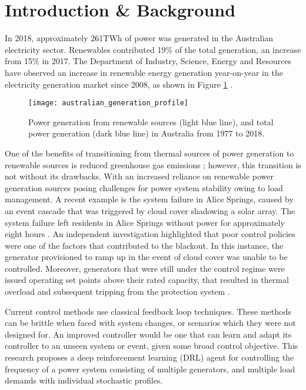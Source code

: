 \section{Introduction \& Background}
In 2018, approximately 261$\si{\tera\watt\hour}$ of power was generated in the Australian electricity sector. Renewables contributed 19\% of the total generation, an increase from 15\% in 2017. The Department of Industry, Science, Energy and Resources have observed an increase in renewable energy generation year-on-year in the electricity generation market since 2008, as shown in Figure \ref{fig:energyts} \cite{Diser2020}.
\begin{figure}[ht]
	\centering
	\texttt{[image: australian\_generation\_profile]}
	\caption{Power generation from renewable sources (light blue line), and total power generation (dark blue line) in Australia from 1977 to 2018.}
	\label{fig:energyts}
\end{figure}

One of the benefits of transitioning from thermal sources of power generation to renewable sources is reduced greenhouse gas emissions \cite{IPCC2012}; however, this transition is not without its drawbacks. With an increased reliance on renewable power generation sources posing challenges for power system stability owing to load management. A recent example is the system failure in Alice Springs, caused by an event cascade that was triggered by cloud cover shadowing a solar array. The system failure left residents in Alice Springs without power for approximately eight hours \cite{UCNT2019}. An independent investigation highlighted that poor control policies were one of the factors that contributed to the blackout. In this instance, the generator provisioned to ramp up in the event of cloud cover was unable to be controlled. Moreover, generators that were still under the control regime were issued operating set points above their rated capacity, that resulted in thermal overload and subsequent tripping from the protection system \cite{Wilkey2019}.

Current control methods use classical feedback loop techniques. These methods can be brittle when faced with system changes, or scenarios which they were not designed for. An improved controller would be one that can learn and adapt its controller to an unseen system or event, given some broad control objective. This research proposes a deep reinforcement learning (DRL) agent for controlling the frequency of a power system consisting of multiple generators, and multiple load demands with individual stochastic profiles.

